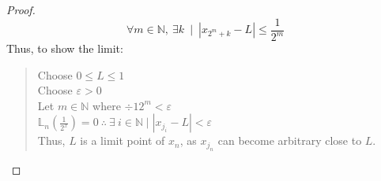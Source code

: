 \begin{proof}
    $$∀m∈ℕ,\ ∃k\ ∣\ \left|x_{2^m+k}-L\right|\le\frac{1}{2^{m}}$$
    Thus, to show the limit:
    \begin{quote}
        Choose $0≤L≤1$ \\
        Choose $ε>0$ \\
        Let $m∈ℕ$ where $÷{1}{2^m}<ε$ \\
        $𝕃_{n}\left(\frac{1}{2^{x}}\right)=0\ ∴\ ∃\ i∈ℕ ∣ \left|x_{j_i}-L\right|<ε$ \\
        Thus, $L$ is a limit point of $x_n$, as $x_{j_n}$ can become arbitrary close to $L$.
    \end{quote}
\end{proof}